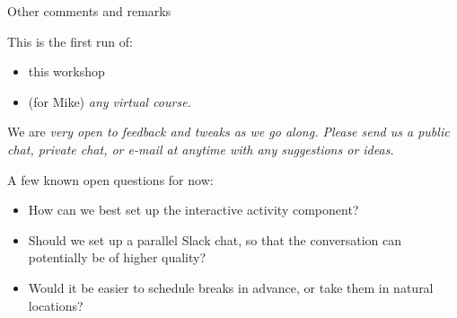 \documentclass[10pt]{beamer}
\begin{document}
\begin{frame}{Other comments and remarks}

This is the first run of:
\begin{itemize}
 \item this workshop 
 \item  (for Mike) \it{any} virtual course. 
 \end{itemize}  

We are \it{very} open to feedback and tweaks as we go along.  Please send us a public chat, private chat, or e-mail at anytime with any suggestions or ideas.

\vfill
A few known open questions for now:
\begin{itemize}
\item How can we best set up the interactive activity component?
\item Should we set up a parallel Slack chat, so that the conversation can potentially be of higher quality?
\item Would it be easier to schedule breaks in advance, or take them in natural locations?
\end{itemize}


\end{frame}
\end{document}
